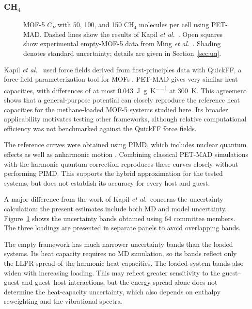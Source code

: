 \documentclass[12pt,a4paper]{article}
\numberwithin{equation}{section}
\begin{document}
\subsubsection{CH$_4$}
\label{sec:mof5-ch4-results}

\begin{figure}[htbp]
  \centering
  \caption{MOF-5 $C_P$ with 50, 100, and 150 CH$_4$ molecules per cell using PET-MAD.
  Dashed lines show the results of Kapil \emph{et al.}~\cite{kapil2019}.
  Open squares show experimental empty-MOF-5 data from
  Ming \emph{et al.}~\cite{ming2014mof5}. Shading denotes standard uncertainty; details are given in
  Section~\ref{sec:uq}.}
  \label{fig:results-cp-mad}
\end{figure}

Kapil \emph{et al.}~\cite{kapil2019} used force fields derived from
first-principles data with QuickFF, a force-field parameterization tool
for MOFs \cite{quickff}. PET-MAD gives very similar heat
capacities, with differences of at most \SI{0.043}{J\per g\per K} at
\SI{300}{K}. This agreement shows that a general-purpose potential can
closely reproduce the reference heat capacities for the methane-loaded
MOF-5 systems studied here. Its broader applicability motivates testing
other frameworks, although relative computational efficiency was not
benchmarked against the QuickFF force fields.

The reference curves were obtained using PIMD, which includes nuclear
quantum effects as well as anharmonic motion \cite{kapil2019}.
Combining classical PET-MAD simulations with the harmonic quantum correction
reproduces these curves closely without performing PIMD. This supports the
hybrid approximation for the tested systems, but does not establish its
accuracy for every host and guest.

A major difference from the work of Kapil \emph{et al.}\ concerns the
uncertainty calculation: the present estimates include both MD and model
uncertainty. Figure~\ref{fig:results-cp-mad} shows the uncertainty bands
obtained using 64 committee members. The three loadings are presented
in separate panels to avoid overlapping bands.

The empty framework has much narrower uncertainty bands than the loaded
systems. Its heat capacity requires no MD simulation, so its bands reflect only
the LLPR spread of the harmonic heat capacities. The loaded-system bands
also widen with increasing loading. This may reflect greater sensitivity
to the guest--guest and guest--host interactions, but the energy spread
alone does not determine the heat-capacity uncertainty, which also depends
on enthalpy reweighting and the vibrational spectra.
\end{document}
